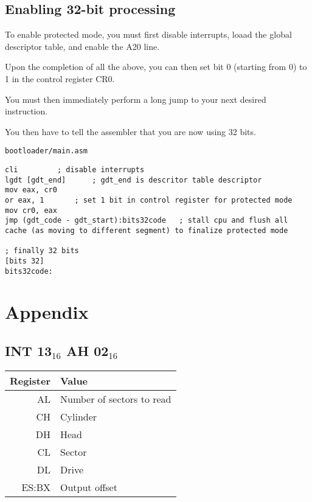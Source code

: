 \documentclass{article}
\begin{document}
\subsection{Enabling 32-bit processing}

To enable protected mode, you must first disable interrupts,
loaad the global descriptor table, and enable the A20 line\cite{intel protected mode enable}.

Upon the completion of all the above, you can then set bit 0 (starting from 0)
to 1 in the control register CR0\cite{intel protected mode enable}.

You must then immediately\cite{intel protected mode enable} perform a long jump
to your next desired instruction.

You then have to tell the assembler that you are now using 32 bits.

\begin{verbatim}
bootloader/main.asm
\end{verbatim}
\begin{verbatim}
cli			; disable interrupts
lgdt [gdt_end]		; gdt_end is descritor table descriptor
mov eax, cr0
or eax, 1		; set 1 bit in control register for protected mode
mov cr0, eax
jmp (gdt_code - gdt_start):bits32code	; stall cpu and flush all cache (as moving to different segment) to finalize protected mode

; finally 32 bits
[bits 32]
bits32code:
\end{verbatim}

\newpage

\section{Appendix}
\appendix

\subsection{INT 13$_{16}$ AH 02$_{16}$}
\label{int 13 ah 02}

\begin{tabular}{|r|l|}
	\hline
	\textbf{Register} & \textbf{Value} \\
	\hline
	AL & Number of sectors to read \\
	\hline
	CH & Cylinder \\
	\hline
	DH & Head \\
	\hline
	CL & Sector \\
	\hline
	DL & Drive \\
	\hline
	ES:BX & Output offset \\
	\hline
\end{tabular}
\end{document}
